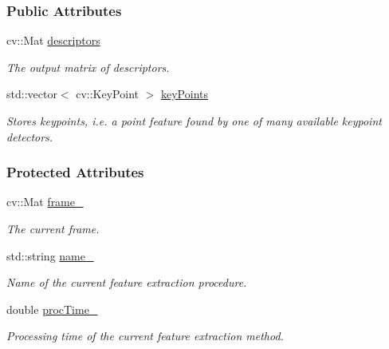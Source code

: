 \subsubsection*{Public Attributes}
\begin{DoxyCompactItemize}
\item 
cv\-::\-Mat \hyperlink{group___feature_extractor_a857c4955b0325d8b96c863d873bf8db5}{descriptors}
\begin{DoxyCompactList}\small\item\em The output matrix of descriptors. \end{DoxyCompactList}\item 
std\-::vector$<$ cv\-::\-Key\-Point $>$ \hyperlink{group___feature_extractor_ac666ae973c3840be1b3b9183dd12b8c1}{key\-Points}
\begin{DoxyCompactList}\small\item\em Stores keypoints, i.\-e. a point feature found by one of many available keypoint detectors. \end{DoxyCompactList}\end{DoxyCompactItemize}
\subsubsection*{Protected Attributes}
\begin{DoxyCompactItemize}
\item 
cv\-::\-Mat \hyperlink{group___feature_extractor_aa805e6fee8eeec2061feabe29430f0df}{frame\-\_\-}
\begin{DoxyCompactList}\small\item\em The current frame. \end{DoxyCompactList}\item 
std\-::string \hyperlink{group___feature_extractor_a46e9fc1f327aaafb10de2c0425d311aa}{name\-\_\-}
\begin{DoxyCompactList}\small\item\em Name of the current feature extraction procedure. \end{DoxyCompactList}\item 
double \hyperlink{group___feature_extractor_a1b176bd48aad30b553e0f87f0264c3d0}{proc\-Time\-\_\-}
\begin{DoxyCompactList}\small\item\em Processing time of the current feature extraction method. \end{DoxyCompactList}\end{DoxyCompactItemize}
